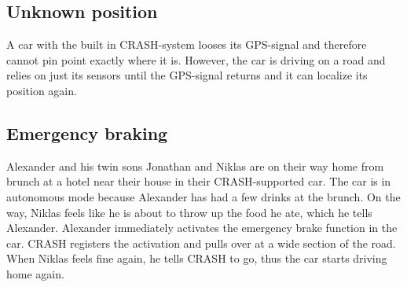 \documentclass{article}
\begin{document}
\subsection {Unknown position}
\noindent A car with the built in CRASH-system looses its GPS-signal and therefore cannot pin point exactly where it is. However, the car is driving on a road and relies on just its sensors until the GPS-signal returns and it can localize its position again.

\subsection {Emergency braking}
\noindent Alexander and his twin sons Jonathan and Niklas are on their way home from brunch at a hotel near their house in their CRASH-supported car. The car is in autonomous mode because Alexander has had a few drinks at the brunch. On the way, Niklas feels like he is about to throw up the food he ate, which he tells Alexander. Alexander immediately activates the emergency brake function in the car. CRASH registers the activation and pulls over at a wide section of the road. When Niklas feels fine again, he tells CRASH to go, thus the car starts driving home again. 

\end{document}
